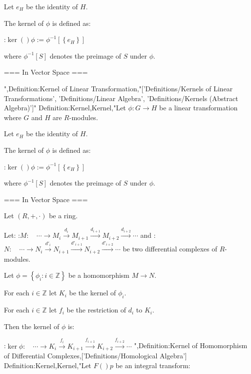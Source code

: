Let $e_H$ be the identity of $H$.


The kernel of $\phi$ is defined as:

:$\ker \left(   \right)\phi := \phi^{-1} \left[ \left\lbrace e_H \right\rbrace  \right]$

where $\phi^{-1} \left[ S \right]$ denotes the preimage of $S$ under $\phi$.


=== In Vector Space ===

",Definition:Kernel of Linear Transformation,"['Definitions/Kernels of Linear Transformations', 'Definitions/Linear Algebra', 'Definitions/Kernels (Abstract Algebra)']"
Definition:Kernel,Kernel,"Let $\phi: G \to H$ be a linear transformation where $G$ and $H$ are $R$-modules.

Let $e_H$ be the identity of $H$.


The kernel of $\phi$ is defined as:

:$\ker \left(   \right)\phi := \phi^{-1} \left[ \left\lbrace e_H \right\rbrace  \right]$

where $\phi^{-1} \left[ S \right]$ denotes the preimage of $S$ under $\phi$.


=== In Vector Space ===

Let $\left( R, +, \cdot \right)$ be a ring.

Let:
:$M: \quad \cdots \longrightarrow M_i \stackrel {d_i} \longrightarrow M_{i + 1} \stackrel {d_{i + 1} } \longrightarrow M_{i + 2} \stackrel {d_{i + 2} } \longrightarrow \cdots$
and
:$N: \quad \cdots \longrightarrow N_i \stackrel {d'_i} \longrightarrow N_{i + 1} \stackrel {d'_{i + 1} } \longrightarrow N_{i + 2} \stackrel {d'_{i + 2} } \longrightarrow \cdots$
be two differential complexes of $R$-modules.

Let $\phi = \left\lbrace \phi_i : i \in \mathbb Z \right\rbrace$ be a homomorphism $M \to N$.

For each $i \in \mathbb Z$ let $K_i$ be the kernel of $\phi_i$.

For each $i \in \mathbb Z$ let $f_i$ be the restriction of $d_i$ to $K_i$.


Then the kernel of $\phi$ is:

:$\ker \phi : \quad \cdots \longrightarrow K_i \stackrel {f_i} \longrightarrow K_{i + 1} \stackrel {f_{i + 1} } \longrightarrow K_{i + 2} \stackrel {f_{i + 2} } \longrightarrow \cdots$
",Definition:Kernel of Homomorphism of Differential Complexes,['Definitions/Homological Algebra']
Definition:Kernel,Kernel,"Let $F \left(   \right)p$ be an integral transform:

